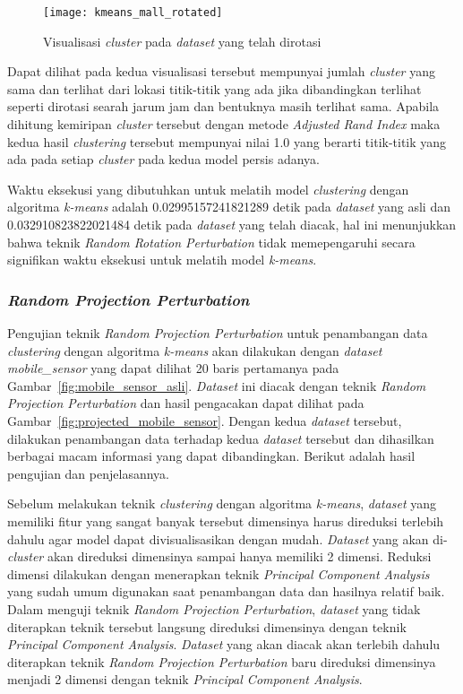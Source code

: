 \begin{figure}
	\centering
	\texttt{[image: kmeans\_mall\_rotated]}
	\caption{Visualisasi \textit{cluster} pada \textit{dataset} yang telah dirotasi}
	\label{fig:kmeans_mall_rotated}
\end{figure}

Dapat dilihat pada kedua visualisasi tersebut mempunyai jumlah \textit{cluster} yang sama dan terlihat dari lokasi titik-titik yang ada jika dibandingkan terlihat seperti dirotasi searah jarum jam dan bentuknya masih terlihat sama. Apabila dihitung kemiripan \textit{cluster} tersebut dengan metode \textit{Adjusted Rand Index} maka kedua hasil \textit{clustering} tersebut mempunyai nilai 1.0 yang berarti titik-titik yang ada pada setiap \textit{cluster} pada kedua model persis adanya.
	
Waktu eksekusi yang dibutuhkan untuk melatih model \textit{clustering} dengan algoritma \textit{k-means} adalah 0.02995157241821289 detik pada \textit{dataset} yang asli dan 0.032910823822021484 detik pada \textit{dataset} yang telah diacak, hal ini menunjukkan bahwa teknik \textit{Random Rotation Perturbation} tidak memepengaruhi secara signifikan waktu eksekusi untuk melatih model \textit{k-means}.

\subsubsection{\textit{Random Projection Perturbation}}
\label{subsubsec:pengujian-clustering-rpp}

Pengujian teknik \textit{Random Projection Perturbation} untuk penambangan data \textit{clustering} dengan algoritma \textit{k-means} akan dilakukan dengan \textit{dataset} \textit{mobile\_sensor} yang dapat dilihat 20 baris pertamanya pada Gambar~\ref{fig:mobile_sensor_asli}. \textit{Dataset} ini diacak dengan teknik \textit{Random Projection Perturbation} dan hasil pengacakan dapat dilihat pada Gambar~\ref{fig:projected_mobile_sensor}. Dengan kedua \textit{dataset} tersebut, dilakukan penambangan data terhadap kedua \textit{dataset} tersebut dan dihasilkan berbagai macam informasi yang dapat dibandingkan. Berikut adalah hasil pengujian dan penjelasannya.

Sebelum melakukan teknik \textit{clustering} dengan algoritma \textit{k-means}, \textit{dataset} yang memiliki fitur yang sangat banyak tersebut dimensinya harus direduksi terlebih dahulu agar model dapat divisualisasikan dengan mudah. \textit{Dataset} yang akan di-\textit{cluster} akan direduksi dimensinya sampai hanya memiliki 2 dimensi. Reduksi dimensi dilakukan dengan menerapkan teknik \textit{Principal Component Analysis} yang sudah umum digunakan saat penambangan data dan hasilnya relatif baik. Dalam menguji teknik \textit{Random Projection Perturbation}, \textit{dataset} yang tidak diterapkan teknik tersebut langsung direduksi dimensinya dengan teknik \textit{Principal Component Analysis}. \textit{Dataset} yang akan diacak akan terlebih dahulu diterapkan teknik \textit{Random Projection Perturbation} baru direduksi dimensinya menjadi 2 dimensi dengan teknik \textit{Principal Component Analysis}.

